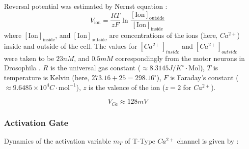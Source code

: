 \documentclass[../../workflow.tex]{subfiles}
\begin{document}
Reversal potential was estimated by Nernst equation \cite{izhikevichDynamicalSystemsNeuroscience2006}:
\begin{equation*}
    V_{\text{ion}} = \frac{RT}{zF}\ln{\frac{[\text{Ion}]_{\text{outside}}}{[\text{Ion}]_{\text{inside}}}}
\end{equation*}
where $[\text{Ion}]_{\text{inside}}$, and $[\text{Ion}]_{\text{outside}}$ are concentrations of the ions
(here, $Ca^{2+}$) inside and outside of the cell. The values for $[Ca^{2+}]_{inside}$ and 
$[Ca^{2+}]_{outside}$ were taken to be $23 nM$, and $0.5 mM$ correspondingly
from the motor neurons in Drosophila \cite{macleodFastCalciumSignals2002}.
$R$ is the universal gas constant
($\approx 8.3145 J/K^\circ \cdot \text{Mol}$), $T$ is temperature is Kelvin (here, $273.16+25=298.16^{\circ}$), $F$ is Faraday's constant
($\approx 9.6485 \times 10^{4} C\cdot \text{mol}^{-1}$), $z$ is the valence of the ion ($z=2$ for $Ca^{2+}$).

\begin{equation*}
    V_{Ca} \approx 128 mV
\end{equation*}


\subsubsection{Activation Gate}
Dynamics of the activation variable $m_T$ of T-Type $Ca^{2+}$ channel is given by \cite{wangModelTtypeCalcium1991}:
\end{document}
